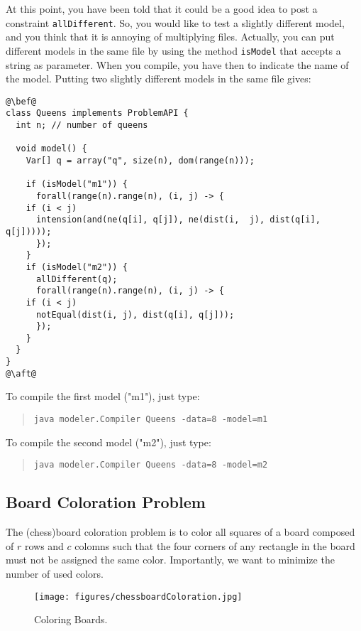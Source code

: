 \documentclass[10pt]{article}
\newcommand{\gb}[1]{{\tt #1}} %
\newcommand{\nn}[1]{{\tt #1}} %
\begin{document}
At this point, you have been told that it could be a good idea to post a constraint \gb{allDifferent}.
So, you would like to test a slightly different model, and you think that it is annoying of multiplying files.
Actually, you can put different models in the same file by using the method \nn{isModel} that accepts a string as parameter.
When you compile, you have then to indicate the name of the model.
Putting two slightly different models in the same file gives:

\begin{lstlisting}
@\bef@
class Queens implements ProblemAPI {
  int n; // number of queens
  
  void model() {
    Var[] q = array("q", size(n), dom(range(n)));

    if (isModel("m1")) {
      forall(range(n).range(n), (i, j) -> {
	if (i < j)
  	  intension(and(ne(q[i], q[j]), ne(dist(i,  j), dist(q[i], q[j]))));
      });
    }
    if (isModel("m2")) {
      allDifferent(q);
      forall(range(n).range(n), (i, j) -> {
	if (i < j)
	  notEqual(dist(i, j), dist(q[i], q[j]));
      });
    }
  }
}
@\aft@
\end{lstlisting}

To compile the first model ("m1"), just type:
\begin{quote}
\begin{verbatim}
java modeler.Compiler Queens -data=8 -model=m1
\end{verbatim}
\end{quote}


To compile the second model ("m2"), just type:
\begin{quote}
\begin{verbatim}
java modeler.Compiler Queens -data=8 -model=m2
\end{verbatim}
\end{quote}




\subsection{Board Coloration Problem}

The (chess)board coloration problem is to color all squares of a board composed of $r$ rows and $c$ colomns such that the four corners of any rectangle in the board must not be assigned the same color.
Importantly, we want to minimize the number of used colors.

\begin{figure}[h]
\begin{center}
  \texttt{[image: figures/chessboardColoration.jpg]}
\end{center}
\caption{Coloring Boards.\label{fig:board}}
\end{figure}
\end{document}
